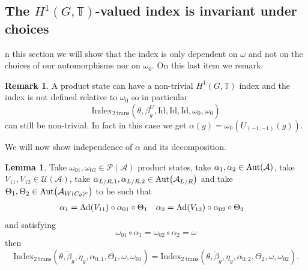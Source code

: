 \documentclass[12pt,a4paper,twoside]{article}
\let\originalleft\left
\let\originalright\right
\renewcommand{\left}{\mathopen{}\mathclose\bgroup\originalleft}
\renewcommand{\right}{\aftergroup\egroup\originalright}
\newcommand{\UU}{\mathcal U}
\newcommand{\PP}{\mathcal P}
\newcommand{\TT}{\mathbb T}
\renewcommand{\AA}{\mathcal A}
\newcommand{\Ad}[1]{\textrm{Ad}\left(#1\right)}
\newcommand{\Aut}[1]{\textrm{Aut}\left(#1\right)}
\theoremstyle{definition}
\newtheorem{lemma}[theorem]{Lemma}
\newtheorem{remark}[theorem]{Remark}
\numberwithin{equation}{section}
\begin{document}
\subsection{The $H^1(G,\TT)$-valued index is invariant under choices}
n this section we will show that the index is only dependent on $\omega$ and not on the choices of our automorphisms nor on $\omega_0$. On this last item we remark:
\begin{remark}
	A product state can have a non-trivial $H^1(G,\TT)$ index and the index is not defined relative to $\omega_0$ so in particular
	\begin{equation}
		\textrm{Index}_{2\:\text{trans}}(\theta,\beta_g^U,\textrm{Id},\textrm{Id},\textrm{Id},\omega_0,\omega_0)
	\end{equation}
	can still be non-trivial. In fact in this case we get $\alpha(g)=\omega_0(U_{(-1,-1)}(g))$.
\end{remark}
We will now show independence of $\alpha$ and its decomposition.
\begin{lemma}
	Take $\omega_{01},\omega_{02}\in\PP(\AA)$ product states, take $\alpha_1,\alpha_2\in\Aut{\AA}$, take $V_{11},V_{12}\in\UU(\AA)$, take $\alpha_{L/R,1},\alpha_{L/R,2}\in\Aut{\AA_{L/R}}$ and take $\Theta_1,\Theta_2\in \Aut{\AA_{W(C_\theta)^c}}$ to be such that
	\begin{align}
		\alpha_1&=\Ad{V_{11}}\circ\alpha_{01}\circ\Theta_1&\alpha_2&=\Ad{V_{12}}\circ\alpha_{02}\circ \Theta_2
	\end{align}
	and satisfying
	\begin{equation}
		\omega_{01}\circ\alpha_1=\omega_{02}\circ\alpha_2=\omega
	\end{equation}
	then
	\begin{equation}
		\textrm{Index}_{2\:\text{trans}}(\theta,\tilde{\beta}_g,\eta_g,\alpha_{0,1},\Theta_1,\omega,\omega_{01})=\textrm{Index}_{2\:\text{trans}}(\theta,\tilde{\beta}_g,\eta_g,\alpha_{0,2},\Theta_2,\omega,\omega_{02}).
	\end{equation}
\end{lemma}
\end{document}
